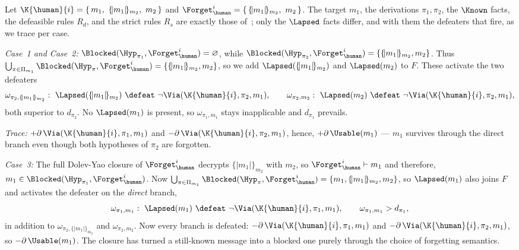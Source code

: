\begin{example}
\label{Ex:DL-Derivability2}
Let $\K{\human}{i}=\{\,m_1,\ \{\!|m_1|\!\}_{m_2},\ m_2\,\}$ and $\Forget_{\human}^{i}=\{\,\{\!|m_1|\!\}_{m_2},\ m_2\,\}$. The target $m_1$, the derivations $\pi_1,\pi_2$, the $\Known$ facts, the defeasible rules $R_d$, and the strict rules $R_s$ are exactly those of~; only the $\Lapsed$ facts differ, and with them the defeaters that fire, as we trace per case.
 
\smallskip\noindent\emph{Case~1 and Case~2:}
$\Blocked(\Hyp_{\pi_1},\Forget_{\human}^{i})=\varnothing$, while $\Blocked(\Hyp_{\pi_2},\Forget_{\human}^{i})=\{\{\!|m_1|\!\}_{m_2},m_2\}$. Thus $\bigcup_{\pi\in\Pi_{m_1}}\Blocked(\Hyp_\pi,\Forget_{\human}^{i})=\{\{\!|m_1|\!\}_{m_2},m_2\}$, so we add $\Lapsed(\{\!|m_1|\!\}_{m_2})$ and $\Lapsed(m_2)$ to $F$. These activate the two defeaters
\[
    \omega_{\pi_2,\{\!|m_1|\!\}_{m_2}}:\ \Lapsed(\{\!|m_1|\!\}_{m_2})\ \defeat\ \neg\Via(\K{\human}{i},\pi_2,m_1),
    \qquad
    \omega_{\pi_2,m_2}:\ \Lapsed(m_2)\ \defeat\ \neg\Via(\K{\human}{i},\pi_2,m_1),
\]
both superior to $d_{\pi_2}$. No $\Lapsed(m_1)$ is present, so $\omega_{\pi_1,m_1}$ stays inapplicable and $d_{\pi_1}$ prevails.
 
\noindent\emph{Trace:} $+\partial\,\Via(\K{\human}{i},\pi_1,m_1)$ and $-\partial\,\Via(\K{\human}{i},\pi_2,m_1)$, hence, $+\partial\,\Usable(m_1)$ --- $m_1$ survives through the direct branch even though both hypotheses of $\pi_2$ are forgotten.
 
\noindent\emph{Case~3:}
The full Dolev-Yao closure of $\Forget_{\human}^{i}$ decrypts $\{\!|m_1|\!\}_{m_2}$ with $m_2$, so $\Forget_{\human}^{i}\vdash m_1$ and therefore, $m_1\in\Blocked(\Hyp_{\pi_1},\Forget_{\human}^{i})$. Now $\bigcup_{\pi\in\Pi_{m_1}}\Blocked(\Hyp_\pi,\Forget_{\human}^{i})=\{m_1,\{\!|m_1|\!\}_{m_2},m_2\}$, so $\Lapsed(m_1)$ also joins $F$ and activates the defeater on the \emph{direct} branch,
\[
\omega_{\pi_1,m_1}:\ \Lapsed(m_1)\ \defeat\ \neg\Via(\K{\human}{i},\pi_1,m_1),
\qquad \omega_{\pi_1,m_1}>d_{\pi_1},
\]
in addition to $\omega_{\pi_2,\{\!|m_1|\!\}_{m_2}}$ and $\omega_{\pi_2,m_2}$. Now every branch is defeated: $-\partial\,\Via(\K{\human}{i},\pi_1,m_1)$ and $-\partial\,\Via(\K{\human}{i},\pi_2,m_1)$, so $-\partial\,\Usable(m_1)$. The closure has turned a still-known message into a blocked one purely through the choice of forgetting semantics.
\end{example}
 
